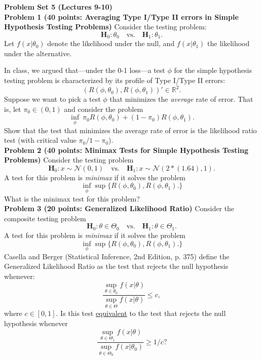 \documentclass[11pt]{article} %
\begin{document}
\onehalfspace

\noindent \textbf{Problem Set 5 (Lectures 9-10)} \\

\noindent \textbf{Problem 1 (40 points: Averaging Type I/Type II errors in Simple Hypothesis Testing Problems)} Consider the testing problem:
\[ \mathbf{H}_0: \theta_0 \quad \textrm{vs.} \quad \mathbf{H}_1: \theta_1. \]
Let $f(x|\theta_0)$ denote the likelihood under the null, and $f(x|\theta_1)$ the likelihood under the alternative. 

In class, we argued that---under the 0-1 loss---a test $\phi$ for the simple hypothesis testing problem is characterized by its profile of Type I/Type II errors: 
\[  (R(\phi,\theta_0), R(\phi,\theta_1))' \in \mathbb{R}^2.  \]
Suppose we want to pick a test $\phi$ that minimizes the \emph{average} rate of error. That is, let $\pi_0 \in (0,1)$ and consider the problem
\begin{equation*}
\inf_{\phi} \:  \pi_0 R(\phi,\theta_0) + (1-\pi_0) R(\phi,\theta_1). 
\end{equation*}
Show that the test that minimizes the average rate of error is the likelihood ratio test (with critical value $\pi_0/1-\pi_0$). \\ 

\noindent \textbf{Problem 2 (40 points: Minimax Tests for Simple Hypothesis Testing Problems)} Consider the testing problem 
\[ \mathbf{H}_0: x \sim \mathcal{N}(0,1) \quad \textrm{vs.} \quad \mathbf{H}_1: x \sim \mathcal{N}(2*(1.64),1). \]
\noindent A test for this problem is \emph{minimax} if it solves the problem 
\[ \inf_{\phi} \sup \{ R(\phi,\theta_0), R(\phi,\theta_1).\} \] 
What is the minimax test for this problem?\\

\noindent \textbf{Problem 3 (20 points: Generalized Likelihood Ratio)} Consider the composite testing problem 
\[ \mathbf{H}_0: \theta \in \Theta_0 \quad \textrm{vs.} \quad \mathbf{H}_1: \theta \in \Theta_1. \]
\noindent A test for this problem is \emph{minimax} if it solves the problem 
\[ \inf_{\phi} \sup \{ R(\phi,\theta_0), R(\phi,\theta_1).\} \] 
Casella and Berger (Statistical Inference, 2nd Edition, p. 375) define the Generalized Likelihood Ratio as the test that rejects the null hypothesis whenever: 
\[   \frac{\sup_{\theta \in \theta_0} f(x|\theta)}{\sup_{\theta \in \Theta} f(x|\theta) } \leq c,   \] 
where $c \in [0,1]$. Is this test \underline{equivalent} to the test that rejects the null hypothesis whenever
\[  \frac{\sup_{\theta \in \Theta_1} f(x|\theta)}{\sup_{\theta \in \Theta_0} f(x|\theta_0) } \geq 1/c?  \]





\end{document}
